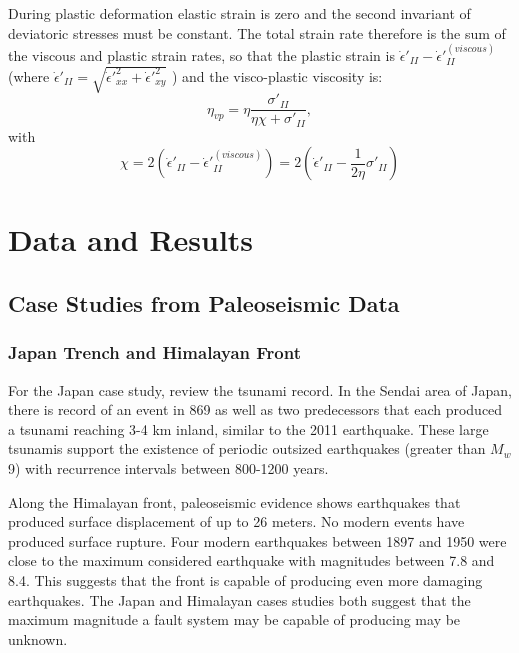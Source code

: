 \documentclass[draft,jgrga]{agutex}
\begin{document}
\begin{article}
During plastic deformation elastic strain is zero and the second invariant of deviatoric stresses must be constant. The total strain rate therefore is the sum of the viscous and plastic strain rates, so that the plastic strain is $\dot{\epsilon}'_{II} - \dot{\epsilon}'^{(viscous)}_{II}$ (where $\dot{\epsilon}'_{II} = \sqrt{\dot{\epsilon}'^2_{xx} + \dot{\epsilon}'^2_{xy}}$ ) and the visco-plastic viscosity is:
\begin{equation}
 	\eta_{vp} = \eta\frac{\sigma'_{II}}{\eta\chi + \sigma'_{II}},
 \end{equation} 
with 
\begin{equation}
	\chi = 2(\dot{\epsilon}'_{II} - \dot{\epsilon}'^{(viscous)}_{II}) = 2(\dot{\epsilon}'_{II} - \frac{1}{2\eta}\sigma'_{II})
\end{equation}

 

\section{Data and Results}

\subsection{Case Studies from Paleoseismic Data}

\subsubsection{Japan Trench and Himalayan Front}

For the Japan case study, \citet{Goldfinger2013} review the tsunami record. In the Sendai area of Japan, there is record of an event in 869 as well as two predecessors that each produced a tsunami reaching 3-4 km inland, similar to the 2011 earthquake. These large tsunamis support the existence of periodic outsized earthquakes (greater than $M_w$ 9) with recurrence intervals between 800-1200 years. 

Along the Himalayan front, paleoseismic evidence shows earthquakes that produced surface displacement of up to 26 meters. No modern events have produced surface rupture. Four modern earthquakes between 1897 and 1950 were close to the maximum considered earthquake with magnitudes between 7.8 and 8.4. This suggests that the front is capable of producing even more damaging earthquakes. The Japan and Himalayan cases studies both suggest that the maximum magnitude a fault system may be capable of producing may be unknown. 


\end{article}
\end{document}
